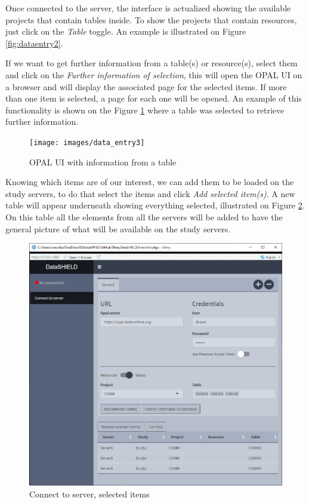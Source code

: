 \documentclass[
]{book}
\begin{document}
Once connected to the server, the interface is actualized showing the available projects that contain tables inside. To show the projects that contain resources, just click on the \emph{Table} toggle. An example is illustrated on Figure \ref{fig:dataentry2}.

If we want to get further information from a table(s) or resource(s), select them and click on the \emph{Further information of selection}, this will open the OPAL UI on a browser and will display the associated page for the selected items. If more than one item is selected, a page for each one will be opened. An example of this functionality is shown on the Figure \ref{fig:dataentry3} where a table was selected to retrieve further information.

\begin{figure}

{\centering \texttt{[image: images/data\_entry3]} 

}

\caption{OPAL UI with information from a table}\label{fig:dataentry3}
\end{figure}

Knowing which items are of our interest, we can add them to be loaded on the study servers, to do that select the items and click \emph{Add selected item(s)}. A new table will appear underneath showing everything selected, illustrated on Figure \ref{fig:dataentry4}. On this table all the elements from all the servers will be added to have the general picture of what will be available on the study servers.

\begin{figure}

{\centering \includegraphics[width=12.68in]{images/data_entry4} 

}

\caption{Connect to server, selected items}\label{fig:dataentry4}
\end{figure}
\end{document}
